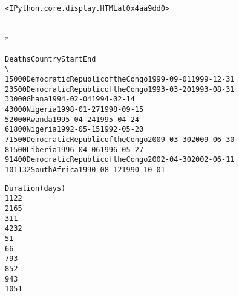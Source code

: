 \documentclass[letterpaper,10pt,english]{/usr/share/sphinx/texinputs/sphinxhowto}
\def\smaller{\fontsize{9.5pt}{9.5pt}\selectfont}
\newenvironment{InvisibleVerbatim}
        {\begin{mdframed}[leftmargin=0.1\linewidth,innerleftmargin=3pt,innerrightmargin=3pt, userdefinedwidth=1\linewidth, linewidth=0pt, linecolor=white, usetwoside=false]}
        {\end{mdframed}}
\begin{document}
    

        
        

            
                \begin{InvisibleVerbatim}
                \vspace{-0.5\baselineskip}
\begin{alltt}<IPython.core.display.HTML at 0x4aa9dd0>\end{alltt}

            \end{InvisibleVerbatim}
            
                \makebox[0.1\linewidth]{\smaller\hfill\tt\color{nbframe-out-prompt}Out\hspace{4pt}{[}35{]}:\hspace{4pt}}\\*
                \vspace{-2.55\baselineskip}\begin{InvisibleVerbatim}
                \vspace{-0.5\baselineskip}
\begin{alltt}    Deaths                           Country       Start         End
\textbackslash{}
1     5000  Democratic Republic of the Congo  1999-09-01  1999-12-31
2     3500  Democratic Republic of the Congo  1993-03-20  1993-08-31
3     3000                             Ghana  1994-02-04  1994-02-14
4     3000                           Nigeria  1998-01-27  1998-09-15
5     2000                            Rwanda  1995-04-24  1995-04-24
6     1800                           Nigeria  1992-05-15  1992-05-20
7     1500  Democratic Republic of the Congo  2009-03-30  2009-06-30
8     1500                           Liberia  1996-04-06  1996-05-27
9     1400  Democratic Republic of the Congo  2002-04-30  2002-06-11
10    1132                      South Africa  1990-08-12  1990-10-01

    Duration (days)
1               122
2               165
3                11
4               232
5                 1
6                 6
7                93
8                52
9                43
10               51\end{alltt}

            \end{InvisibleVerbatim}
            
\end{document}
